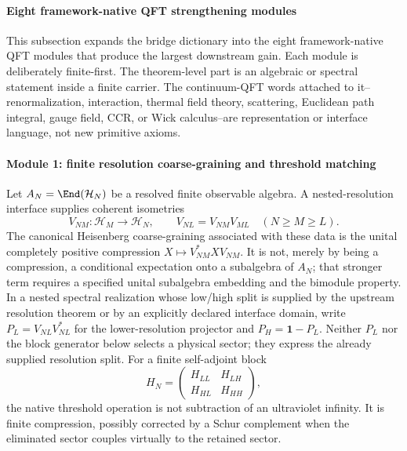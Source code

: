 \documentclass[12pt,a4paper]{article}
\begin{document}
\paragraph{Eight framework-native QFT strengthening modules}
\label{p4:sec:eight-native-qft-modules}

This subsection expands the bridge dictionary into the eight framework-native QFT modules that produce the largest downstream gain.  Each module is deliberately finite-first.  The theorem-level part is an algebraic or spectral statement inside a finite carrier.  The continuum-QFT words attached to it--renormalization, interaction, thermal field theory, scattering, Euclidean path integral, gauge field, CCR, or Wick calculus--are representation or interface language, not new primitive axioms.

\paragraph{Module 1: finite resolution coarse-graining and threshold matching}
\label{p4:sec:module-finite-rg-thresholds}

Let \(A_N=\End(\mathcal H_N)\) be a resolved finite observable algebra.  A
nested-resolution interface supplies coherent isometries
\[
V_{NM}:\mathcal H_M\longrightarrow\mathcal H_N,
\qquad
V_{NL}=V_{NM}V_{ML}\quad(N\ge M\ge L).
\]
The canonical Heisenberg coarse-graining associated with these data is the
unital completely positive compression \(X\mapsto V_{NM}^*XV_{NM}\).
It is not, merely by being a compression, a conditional expectation onto a
subalgebra of \(A_N\); that stronger term requires a specified unital
subalgebra embedding and the bimodule property.  In a nested spectral
realization whose low/high split is supplied by the upstream resolution
theorem or by an explicitly declared interface domain, write
\(P_L=V_{NL}V_{NL}^*\) for the lower-resolution projector and
\(P_H=\mathbf 1-P_L\).  Neither \(P_L\) nor the block generator below selects
a physical sector; they express the already supplied resolution split.  For
a finite self-adjoint block
\[
H_N=\begin{pmatrix}
H_{LL} & H_{LH}\\
H_{HL} & H_{HH}
\end{pmatrix},
\]
the native threshold operation is not subtraction of an ultraviolet infinity.  It is finite compression, possibly corrected by a Schur complement when the eliminated sector couples virtually to the retained sector.
\end{document}
